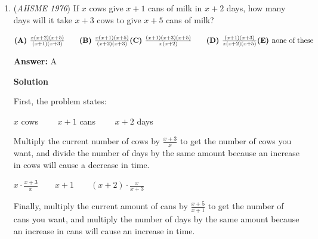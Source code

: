 \begin{enumerate}
 \textbf{Answer: }C



\textbf{Solution}

To find the largest number of "repeated" crates necessary, we must account for all the possibilities of the number of apples in each crate. Since each crate contains a minimum of $120$ apples and a maximum of $144$ apples, there are $144 - 120 + 1 = 25$ different amounts possible for the number of apples per crate.

 Now, we have to count for the worst case scenario: the $25$ amounts are repeated as many times as possible.

 $25$ can go into $128$ exactly $5$ times because $5 \cdot 25 = 125$, which is less than $128$. This leaves a remainder of $3$ crates.

 The worst case scenario would be that these $3$ crates have a different number of apples each. It doesn't actually matter how many apples are in these $3$ crates because any of the $25$ values would be repeated again anyway. So, the answer is $5 + 1 = \boxed{\textbf{(C) }6}$ ~\href{https://artofproblemsolving.com/wiki/index.php/User:Jiang147369}{jiang147369}

 


	\item (\textit{AHSME 1976}) If $x$ cows give $x+1$ cans of milk in $x+2$ days, how many days will it take $x+3$ cows to give $x+5$ cans of milk?


 $\textbf{(A) }\frac{x(x+2)(x+5)}{(x+1)(x+3)}\qquad \textbf{(B) }\frac{x(x+1)(x+5)}{(x+2)(x+3)}\qquad\\ \textbf{(C) }\frac{(x+1)(x+3)(x+5)}{x(x+2)}\qquad \textbf{(D) }\frac{(x+1)(x+3)}{x(x+2)(x+5)}\qquad \\ \textbf{(E) }\text{none of these}$

 \textbf{Answer: }A



\textbf{Solution}

First, the problem states:

  $x$ cows $\qquad x+1$ cans $\qquad x+2$ days 

 Multiply the current number of cows by $\frac{x+3}{x}$ to get the number of cows you want, and divide the number of days by the same amount because an increase in cows will cause a decrease in time.

  $x \cdot \frac{x+3}{x} \qquad x+1 \qquad (x+2) \cdot \frac{x}{x+3}$

 Finally, multiply the current amount of cans by $\frac{x+5}{x+1}$ to get the number of cans you want, and multiply the number of days by the same amount because an increase in cans will cause an increase in time.


\end{enumerate}

